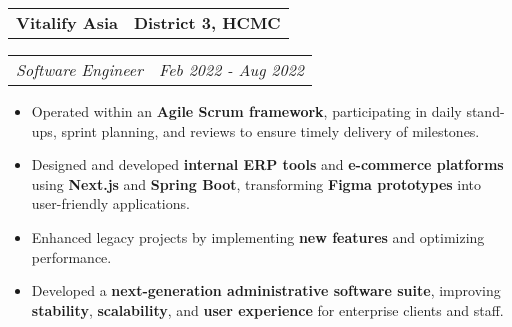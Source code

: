 \documentclass[11pt,letterpaper]{article}
\makeatletter
\newcommand{\headerrow}[2]
{\begin{tabular*}{\linewidth}{l@{\extracolsep{\fill}}r}
#1 &
#2 \\
\end{tabular*}}
\makeatother
\begin{document}
\headerrow
{\large\textbf{Vitalify Asia}}
{\textbf{District 3, HCMC}}
\headerrow
{\emph{Software Engineer}}
{\emph{Feb 2022 - Aug 2022}}
\begin{itemize}[leftmargin=1em,noitemsep]
    \item Operated within an \textbf{Agile Scrum framework}, participating in daily stand-ups, sprint planning, and reviews to ensure timely delivery of milestones.
    \item Designed and developed \textbf{internal ERP tools} and \textbf{e-commerce platforms} using \textbf{Next.js} and \textbf{Spring Boot}, transforming \textbf{Figma prototypes} into user-friendly applications.
    \item Enhanced legacy projects by implementing \textbf{new features} and optimizing performance.
    \item Developed a \textbf{next-generation administrative software suite}, improving \textbf{stability}, \textbf{scalability}, and \textbf{user experience} for enterprise clients and staff.
\end{itemize}
\end{document}
